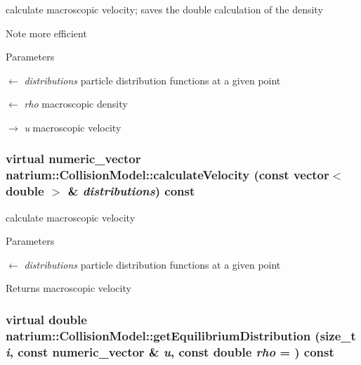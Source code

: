 calculate macroscopic velocity; saves the double calculation of the density \begin{DoxyNote}{Note}
more efficient 
\end{DoxyNote}

\begin{DoxyParams}{Parameters}
\item[\mbox{$\leftarrow$} {\em distributions}]particle distribution functions at a given point \item[\mbox{$\leftarrow$} {\em rho}]macroscopic density \item[\mbox{$\rightarrow$} {\em u}]macroscopic velocity \end{DoxyParams}
\hypertarget{classnatrium_1_1CollisionModel_a90428f4c29916641de3de872803dde0f}{
\subsubsection[{calculateVelocity}]{\setlength{\rightskip}{0pt plus 5cm}virtual numeric\_\-vector natrium::CollisionModel::calculateVelocity (const vector$<$ double $>$ \& {\em distributions}) const}}
\label{classnatrium_1_1CollisionModel_a90428f4c29916641de3de872803dde0f}


calculate macroscopic velocity 
\begin{DoxyParams}{Parameters}
\item[\mbox{$\leftarrow$} {\em distributions}]particle distribution functions at a given point \end{DoxyParams}
\begin{DoxyReturn}{Returns}
macroscopic velocity 
\end{DoxyReturn}
\hypertarget{classnatrium_1_1CollisionModel_a88b382d63da80e950bc58e8afad769a6}{
\subsubsection[{getEquilibriumDistribution}]{\setlength{\rightskip}{0pt plus 5cm}virtual double natrium::CollisionModel::getEquilibriumDistribution (size\_\-t {\em i}, \/  const numeric\_\-vector \& {\em u}, \/  const double {\em rho} = {}) const}}
\label{classnatrium_1_1CollisionModel_a88b382d63da80e950bc58e8afad769a6}


